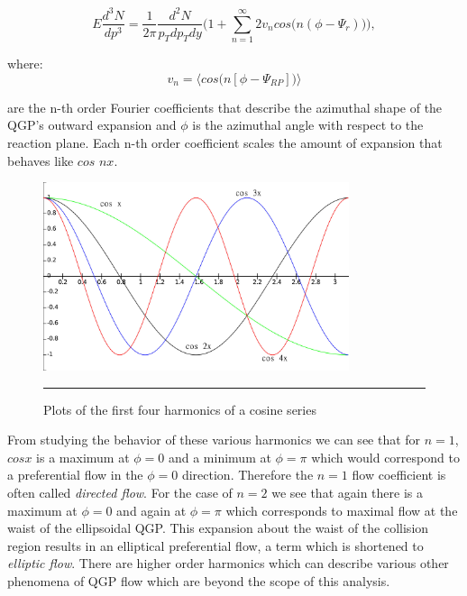 \begin{equation}
E \frac{d^{3}N}{dp^{3}} = \frac{1}{2 \pi} \frac{d^{2}N}{p_{T} dp_{T}dy}\Big( 1 + \sum^{\infty}_{n=1} 2 v_{n} cos\big(n(\phi - \Psi_{r})\big) \Big),
\end{equation}

where:
\begin{equation}
v_{n} = \bigg \langle cos \Big( n [\phi - \Psi_{RP}]\Big) \bigg \rangle
\end{equation}

are the n-th order Fourier coefficients that describe the azimuthal shape of the QGP's outward expansion and $\phi$ is the azimuthal angle with respect to the reaction plane. Each n-th order coefficient scales the amount of expansion that behaves like $cos$ $nx$.

\begin{figure}[htbp!]
  \centering
    \includegraphics[width=0.8\textwidth]{Figures/fouriercosines.jpg}
    \rule{35em}{0.5pt}
  \caption[Plots of the first four harmonics of a cosine series]{Plots of the first four harmonics of a cosine series}
  \label{fig:fouriercosines}
\end{figure}

From studying the behavior of these various harmonics we can see that for $n=1$, $cos x$ is a maximum at $\phi=0$ and a minimum at $\phi = \pi$ which would correspond to a preferential flow in the $\phi=0$ direction. Therefore the $n=1$ flow coefficient is often called \textit{directed flow}. For the case of $n=2$ we see that again there is a maximum at $\phi=0$ and again at $\phi=\pi$ which corresponds to maximal flow at the waist of the ellipsoidal QGP. This expansion about the waist of the collision region results in an elliptical preferential flow, a term which is shortened to \textit{elliptic flow}. There are higher order harmonics which can describe various other phenomena of QGP flow which are beyond the scope of this analysis.

\pagebreak
\pagebreak

